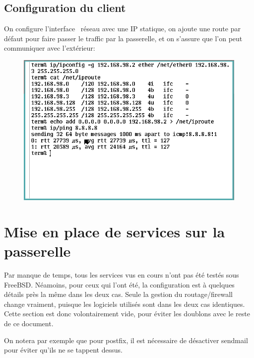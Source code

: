 \documentclass[a4paper]{article}
\begin{document}
\subsection{Configuration du client}
On configure l'\og interface \fg\ réseau avec une IP statique,
on ajoute une route par défaut pour faire passer le traffic par
la passerelle, et on s'assure que l'on peut communiquer avec
l'extérieur:
\begin{figure}[!ht]
	\centering
	\includegraphics[scale=.5]{ipconfig.png}
\end{figure}

\section{Mise en place de services sur la passerelle}
Par manque de temps, tous les services vus en cours n'ont pas été
testés sous FreeBSD. Néamoins, pour ceux qui l'ont été,
la configuration est à quelques détails près la même dans
les deux cas. Seule la gestion du routage/firewall change vraiment,
puisque les logiciels utilisés sont dans les deux cas identiques.
Cette section est donc volontairement vide, pour éviter les doublons
avec le reste de ce document.

On notera par exemple que pour postfix, il est nécessaire de
désactiver sendmail pour éviter qu'ils ne se tappent dessus.
\end{document}
